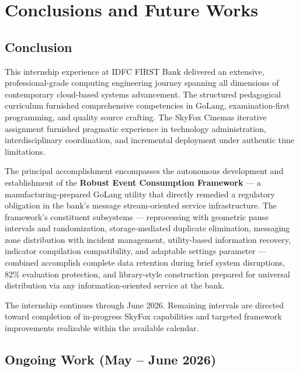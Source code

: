 \chapter{Conclusions and Future Works}

\section{Conclusion}

This internship experience at IDFC FIRST Bank delivered an extensive, professional-grade 
computing engineering journey spanning all dimensions of contemporary cloud-based systems 
advancement. The structured pedagogical curriculum furnished comprehensive competencies in 
GoLang, examination-first programming, and quality source crafting. The SkyFox Cinemas 
iterative assignment furnished pragmatic experience in technology administration, 
interdisciplinary coordination, and incremental deployment under authentic time limitations.

The principal accomplishment encompasses the autonomous development and establishment of the 
\textbf{Robust Event Consumption Framework} --- a manufacturing-prepared GoLang utility that 
directly remedied a regulatory obligation in the bank's message stream-oriented service 
infrastructure. The framework's constituent subsystems --- reprocessing with geometric pause 
intervals and randomization, storage-mediated duplicate elimination, messaging zone distribution 
with incident management, utility-based information recovery, indicator compilation 
compatibility, and adaptable settings parameter --- combined accomplish complete data retention 
during brief system disruptions, 82\% evaluation protection, and library-style construction 
prepared for universal distribution via any information-oriented service at the bank.

The internship continues through June 2026. Remaining intervals are directed toward completion 
of in-progress SkyFox capabilities and targeted framework improvements realizable within the 
available calendar.

\section{Ongoing Work (May -- June 2026)}

